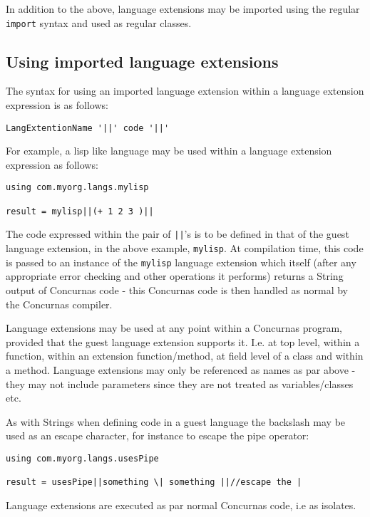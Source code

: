 \documentclass[conc-doc]{subfiles}
\begin{document}
In addition to the above, language extensions may be imported using the regular \lstinline{import} syntax and used as regular classes.

\subsection{Using imported language extensions}
The syntax for using an imported language extension within a language extension expression is as follows:

\begin{center}
	\lstinline{LangExtentionName '||' code '||'}
\end{center}

For example, a lisp like language may be used within a language extension expression as follows:

\begin{lstlisting}
using com.myorg.langs.mylisp

result = mylisp||(+ 1 2 3 )||
\end{lstlisting}

The code expressed within the pair of \lstinline{||}'s is to be defined in that of the guest language extension, in the above example, \lstinline{mylisp}. At compilation time, this code is passed to an instance of the \lstinline{mylisp} language extension which itself (after any appropriate error checking and other operations it performs) returns a String output of Concurnas code - this Concurnas code is then handled as normal by the Concurnas compiler.

Language extensions may be used at any point within a Concurnas program, provided that the guest language extension supports it. I.e. at top level, within a function, within an extension function/method, at field level of a class and within a method. Language extensions may only be referenced as names as par above - they may not include parameters since they are not treated as variables/classes etc.

As with Strings when defining code in a guest language the backslash may be used as an escape character, for instance to escape the pipe operator:

\begin{lstlisting}
using com.myorg.langs.usesPipe

result = usesPipe||something \| something ||//escape the |
\end{lstlisting}

Language extensions are executed as par normal Concurnas code, i.e as isolates. 
\end{document}

